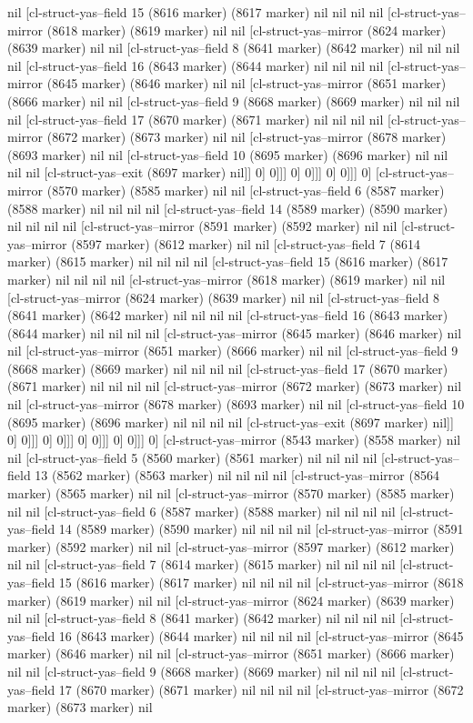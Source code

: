 {{nil [cl-struct-yas--field 15 (8616 marker) (8617 marker) nil nil nil nil [cl-struct-yas--mirror (8618 marker) (8619 marker) nil nil [cl-struct-yas--mirror (8624 marker) (8639 marker) nil nil [cl-struct-yas--field 8 (8641 marker) (8642 marker) nil nil nil nil [cl-struct-yas--field 16 (8643 marker) (8644 marker) nil nil nil nil [cl-struct-yas--mirror (8645 marker) (8646 marker) nil nil [cl-struct-yas--mirror (8651 marker) (8666 marker) nil nil [cl-struct-yas--field 9 (8668 marker) (8669 marker) nil nil nil nil [cl-struct-yas--field 17 (8670 marker) (8671 marker) nil nil nil nil [cl-struct-yas--mirror (8672 marker) (8673 marker) nil nil [cl-struct-yas--mirror (8678 marker) (8693 marker) nil nil [cl-struct-yas--field 10 (8695 marker) (8696 marker) nil nil nil nil [cl-struct-yas--exit (8697 marker) nil]] 0] 0]]] 0] 0]]] 0] 0]]] 0] [cl-struct-yas--mirror (8570 marker) (8585 marker) nil nil [cl-struct-yas--field 6 (8587 marker) (8588 marker) nil nil nil nil [cl-struct-yas--field 14 (8589 marker) (8590 marker) nil nil nil nil [cl-struct-yas--mirror (8591 marker) (8592 marker) nil nil [cl-struct-yas--mirror (8597 marker) (8612 marker) nil nil [cl-struct-yas--field 7 (8614 marker) (8615 marker) nil nil nil nil [cl-struct-yas--field 15 (8616 marker) (8617 marker) nil nil nil nil [cl-struct-yas--mirror (8618 marker) (8619 marker) nil nil [cl-struct-yas--mirror (8624 marker) (8639 marker) nil nil [cl-struct-yas--field 8 (8641 marker) (8642 marker) nil nil nil nil [cl-struct-yas--field 16 (8643 marker) (8644 marker) nil nil nil nil [cl-struct-yas--mirror (8645 marker) (8646 marker) nil nil [cl-struct-yas--mirror (8651 marker) (8666 marker) nil nil [cl-struct-yas--field 9 (8668 marker) (8669 marker) nil nil nil nil [cl-struct-yas--field 17 (8670 marker) (8671 marker) nil nil nil nil [cl-struct-yas--mirror (8672 marker) (8673 marker) nil nil [cl-struct-yas--mirror (8678 marker) (8693 marker) nil nil [cl-struct-yas--field 10 (8695 marker) (8696 marker) nil nil nil nil [cl-struct-yas--exit (8697 marker) nil]] 0] 0]]] 0] 0]]] 0] 0]]] 0] 0]]] 0] [cl-struct-yas--mirror (8543 marker) (8558 marker) nil nil [cl-struct-yas--field 5 (8560 marker) (8561 marker) nil nil nil nil [cl-struct-yas--field 13 (8562 marker) (8563 marker) nil nil nil nil [cl-struct-yas--mirror (8564 marker) (8565 marker) nil nil [cl-struct-yas--mirror (8570 marker) (8585 marker) nil nil [cl-struct-yas--field 6 (8587 marker) (8588 marker) nil nil nil nil [cl-struct-yas--field 14 (8589 marker) (8590 marker) nil nil nil nil [cl-struct-yas--mirror (8591 marker) (8592 marker) nil nil [cl-struct-yas--mirror (8597 marker) (8612 marker) nil nil [cl-struct-yas--field 7 (8614 marker) (8615 marker) nil nil nil nil [cl-struct-yas--field 15 (8616 marker) (8617 marker) nil nil nil nil [cl-struct-yas--mirror (8618 marker) (8619 marker) nil nil [cl-struct-yas--mirror (8624 marker) (8639 marker) nil nil [cl-struct-yas--field 8 (8641 marker) (8642 marker) nil nil nil nil [cl-struct-yas--field 16 (8643 marker) (8644 marker) nil nil nil nil [cl-struct-yas--mirror (8645 marker) (8646 marker) nil nil [cl-struct-yas--mirror (8651 marker) (8666 marker) nil nil [cl-struct-yas--field 9 (8668 marker) (8669 marker) nil nil nil nil [cl-struct-yas--field 17 (8670 marker) (8671 marker) nil nil nil nil [cl-struct-yas--mirror (8672 marker) (8673 marker) nil }}
